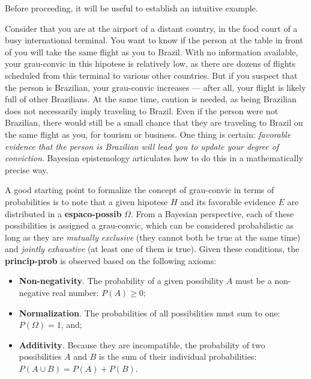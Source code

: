 \documentclass[./main_en.tex]{subfiles}
\begin{document}
\par Before proceeding, it will be useful to establish an intuitive example.

\par Consider that you are at the airport of a distant country, in the food court of a busy international terminal. You want to know if the person at the table in front of you will take the same flight as you to Brazil. With no information available, your \gls{grau-convic} in this \gls{hipotese} is relatively low, as there are dozens of flights scheduled from this terminal to various other countries. But if you suspect that the person is Brazilian, your \gls{grau-convic} increases — after all, your flight is likely full of other Brazilians. At the same time, caution is needed, as being Brazilian does not necessarily imply traveling to Brazil. Even if the person were not Brazilian, there would still be a small chance that they are traveling to Brazil on the same flight as you, for tourism or business. One thing is certain: \textit{favorable evidence that the person is Brazilian will lead you to update your degree of conviction}. Bayesian epistemology articulates how to do this in a mathematically precise way.

\par A good starting point to formalize the concept of \gls{grau-convic} in terms of probabilities is to note that a given \gls{hipotese} $H$ and its favorable evidence $E$ are distributed in a \textbf{\gls{espaco-possib}} $\Omega$. From a Bayesian perspective, each of these possibilities is assigned a \gls{grau-convic}, which can be considered probabilistic as long as they are \textit{mutually exclusive} (they cannot both be true at the same time) and \textit{jointly exhaustive} (at least one of them is true). Given these conditions, the \textbf{\gls{princip-prob}} is observed based on the following axioms:
\begin{itemize}
    \item \textbf{Non-negativity}. The probability of a given possibility $A$ must be a non-negative real number: $P(A) \geq 0$;
    \item \textbf{Normalization}. The probabilities of all possibilities must sum to one: $P(\Omega) = 1$, and;
    \item \textbf{Additivity}. Because they are incompatible, the probability of two possibilities $A$ and $B$ is the sum of their individual probabilities: $P(A \cup B ) = P(A) + P(B)$.
\end{itemize}
\end{document}
